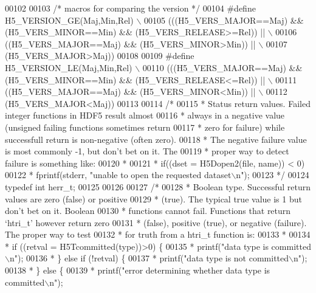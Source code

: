 \begin{DoxyCode}
00102 
00103 \textcolor{comment}{/* macros for comparing the version */}
00104 \textcolor{preprocessor}{#define H5\_VERSION\_GE(Maj,Min,Rel) \(\backslash\)}
00105 \textcolor{preprocessor}{       (((H5\_VERS\_MAJOR==Maj) && (H5\_VERS\_MINOR==Min) && (H5\_VERS\_RELEASE>=Rel)) || \(\backslash\)}
00106 \textcolor{preprocessor}{        ((H5\_VERS\_MAJOR==Maj) && (H5\_VERS\_MINOR>Min)) || \(\backslash\)}
00107 \textcolor{preprocessor}{        (H5\_VERS\_MAJOR>Maj))}
00108 
00109 \textcolor{preprocessor}{#define H5\_VERSION\_LE(Maj,Min,Rel) \(\backslash\)}
00110 \textcolor{preprocessor}{       (((H5\_VERS\_MAJOR==Maj) && (H5\_VERS\_MINOR==Min) && (H5\_VERS\_RELEASE<=Rel)) || \(\backslash\)}
00111 \textcolor{preprocessor}{        ((H5\_VERS\_MAJOR==Maj) && (H5\_VERS\_MINOR<Min)) || \(\backslash\)}
00112 \textcolor{preprocessor}{        (H5\_VERS\_MAJOR<Maj))}
00113 
00114 \textcolor{comment}{/*}
00115 \textcolor{comment}{ * Status return values.  Failed integer functions in HDF5 result almost}
00116 \textcolor{comment}{ * always in a negative value (unsigned failing functions sometimes return}
00117 \textcolor{comment}{ * zero for failure) while successfull return is non-negative (often zero).}
00118 \textcolor{comment}{ * The negative failure value is most commonly -1, but don't bet on it.  The}
00119 \textcolor{comment}{ * proper way to detect failure is something like:}
00120 \textcolor{comment}{ *}
00121 \textcolor{comment}{ *  if((dset = H5Dopen2(file, name)) < 0)}
00122 \textcolor{comment}{ *      fprintf(stderr, "unable to open the requested dataset\(\backslash\)n");}
00123 \textcolor{comment}{ */}
00124 \textcolor{keyword}{typedef} \textcolor{keywordtype}{int} herr\_t;
00125 
00126 
00127 \textcolor{comment}{/*}
00128 \textcolor{comment}{ * Boolean type.  Successful return values are zero (false) or positive}
00129 \textcolor{comment}{ * (true). The typical true value is 1 but don't bet on it.  Boolean}
00130 \textcolor{comment}{ * functions cannot fail.  Functions that return `htri\_t' however return zero}
00131 \textcolor{comment}{ * (false), positive (true), or negative (failure). The proper way to test}
00132 \textcolor{comment}{ * for truth from a htri\_t function is:}
00133 \textcolor{comment}{ *}
00134 \textcolor{comment}{ *  if ((retval = H5Tcommitted(type))>0) \{}
00135 \textcolor{comment}{ *      printf("data type is committed\(\backslash\)n");}
00136 \textcolor{comment}{ *  \} else if (!retval) \{}
00137 \textcolor{comment}{ *      printf("data type is not committed\(\backslash\)n");}
00138 \textcolor{comment}{ *  \} else \{}
00139 \textcolor{comment}{ *      printf("error determining whether data type is committed\(\backslash\)n");}

\end{DoxyCode}
